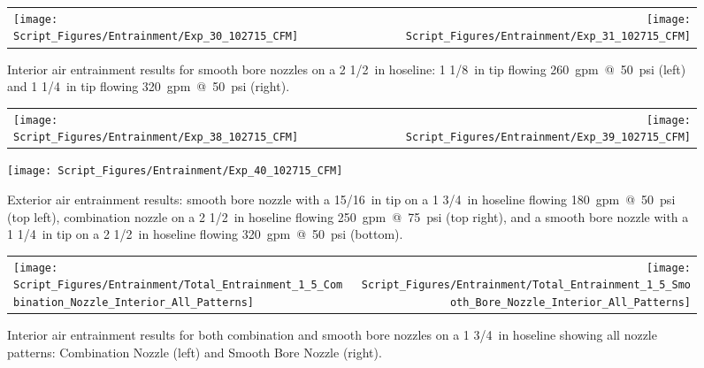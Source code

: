 \documentclass[12pt,oneside]{book}
\begin{document}
\clearpage

\begin{figure}[!ht]
\begin{tabular*}{\textwidth}{lr}
\texttt{[image: Script\_Figures/Entrainment/Exp\_30\_102715\_CFM]} &
\texttt{[image: Script\_Figures/Entrainment/Exp\_31\_102715\_CFM]} \\
\end{tabular*}
\caption[Air Entrainment for 2~1/2~in Hoseline with Smooth Bore Nozzle from Interior]{Interior air entrainment results for smooth bore nozzles on a 2 1/2~in hoseline: 1 1/8~in tip flowing 260~gpm~@~50~psi (left) and 1 1/4~in tip flowing 320~gpm~@~50~psi (right).}
\label{fig:2_5_Interior_Smooth_Bore}
\end{figure}

\clearpage

\begin{figure}[!ht]
\begin{tabular*}{\textwidth}{lr}
\texttt{[image: Script\_Figures/Entrainment/Exp\_38\_102715\_CFM]} &
\texttt{[image: Script\_Figures/Entrainment/Exp\_39\_102715\_CFM]} \\
\end{tabular*}
\centering
\texttt{[image: Script\_Figures/Entrainment/Exp\_40\_102715\_CFM]} 
\caption[Air Entrainment for 2~1/2~in Hoseline with Smooth Bore Nozzle from Exterior]{Exterior air entrainment results: smooth bore nozzle with a 15/16~in tip on a 1 3/4~in hoseline flowing 180~gpm~@~50~psi (top left), combination nozzle on a 2 1/2~in hoseline flowing 250~gpm~@~75~psi (top right), and a smooth bore nozzle with a 1 1/4~in tip on a 2 1/2~in hoseline flowing 320~gpm~@~50~psi (bottom).}
\label{fig:Exterior_Tests}
\end{figure}

\clearpage

\begin{figure}[!ht]
\begin{tabular*}{\textwidth}{lr}
\texttt{[image: Script\_Figures/Entrainment/Total\_Entrainment\_1\_5\_Combination\_Nozzle\_Interior\_All\_Patterns]} &
\texttt{[image: Script\_Figures/Entrainment/Total\_Entrainment\_1\_5\_Smooth\_Bore\_Nozzle\_Interior\_All\_Patterns]} \\
\end{tabular*}
\caption[Air Entrainment for 1~3/4~in Hoseline with All Nozzle Patterns from Interior]{Interior air entrainment results for both combination and smooth bore nozzles on a 1 3/4~in hoseline showing all nozzle patterns: Combination Nozzle (left) and Smooth Bore Nozzle (right).}
\label{fig:1_5_Interior_SS_SB_All_Patterns}
\end{figure}
\end{document}
